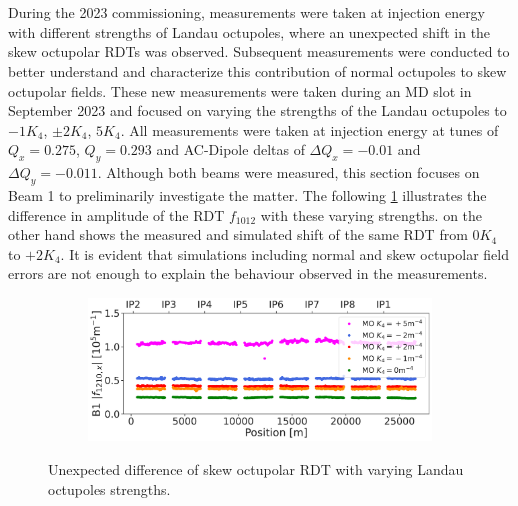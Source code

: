 \FloatBarrier
\section{}


\subsection{}

During the 2023 commissioning, measurements were taken at injection energy with different strengths
of Landau octupoles, where an unexpected shift in the skew octupolar RDTs was observed. Subsequent
measurements were conducted to better understand and characterize this contribution of normal
octupoles to skew octupolar fields. These new measurements were taken during an MD slot in September
2023 and focused on varying the strengths of the Landau octupoles to $-1K_4$, $\pm2 K_4$, $5K_4$.
All measurements were taken at injection energy at tunes of $Q_x = 0.275$, $Q_y = 0.293$ and
AC-Dipole deltas of $\Delta Q_x = -0.01$ and $\Delta Q_y = -0.011$. Although both beams were
measured, this section focuses on Beam 1 to preliminarily investigate the matter.  The following
\cref{fig:skew_octupolar:mo_different_levels_meas} illustrates the difference in amplitude of the
RDT $f_{1012}$ with these varying strengths.
 on the other hand shows the measured and simulated shift
of the same RDT from $0K_4$ to $+2K_4$. It is evident that simulations including normal and skew 
octupolar field errors are not enough to explain the behaviour observed in the measurements.

\begin{figure}[!htb]
    \centering
    \begin{subfigure}{0.8\textwidth}
        \includegraphics[width=\textwidth]{./images/skew_octupoles/f1210_AMP_all_measurements.pdf}
    \end{subfigure}
    \caption{Unexpected difference of skew octupolar RDT with varying Landau octupoles strengths.}
    \label{fig:skew_octupolar:mo_different_levels_meas}
\end{figure}

